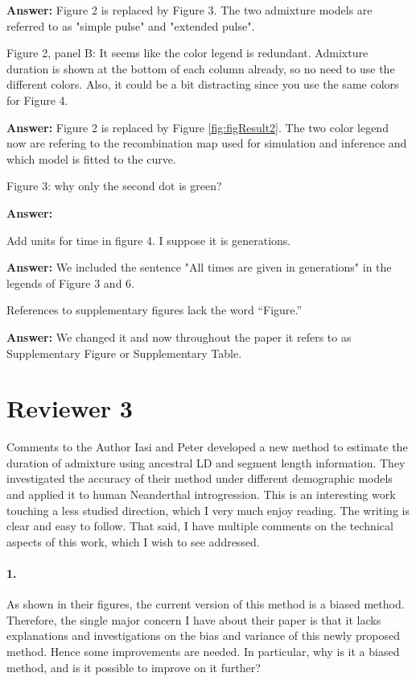\documentclass[11pt]{article}
\let\oldparagraph\paragraph
\renewcommand{\paragraph}[1]{\oldparagraph{#1}\mbox{}}
\begin{document}
\textbf{Answer:} Figure 2 is replaced by Figure 3. The two admixture models are referred  to as "simple pulse" and "extended pulse".


Figure 2, panel B: It seems like the color legend is redundant. Admixture duration is shown at the bottom of each column already, so no need to use the different colors. Also, it could be a bit distracting since you use the same colors for Figure 4. 

\textbf{Answer:} Figure 2 is replaced by Figure \ref{fig:figResult2}. The two color legend now are refering to the recombination map used for simulation and inference and which model is fitted to the curve.

Figure 3: why only the second dot is green?

\textbf{Answer:} 

Add units for time in figure 4. I suppose it is generations.

\textbf{Answer:} We included the sentence "All times are given in generations" in the legends of Figure 3 and 6.

References to supplementary figures lack the word “Figure.” 

\textbf{Answer:} We changed it and now throughout the paper it refers to as Supplementary Figure or Supplementary Table.

\section{Reviewer 3}\label{Reviewer 3}

Comments to the Author
Iasi and Peter developed a new method to estimate the duration of admixture using ancestral LD and segment length information. They investigated the accuracy of their method under different demographic models and applied it to human Neanderthal introgression. This is an interesting work touching a less studied direction, which I very much enjoy reading. The writing is clear and easy to follow. That said, I have multiple comments on the technical aspects of this work, which I wish to see addressed. 

\paragraph{1.}
As shown in their figures, the current version of this method is a biased method. Therefore, the single major concern I have about their paper is that it lacks explanations and investigations on the bias and variance of this newly proposed method. Hence some improvements are needed. In particular, why is it a biased method, and is it possible to improve on it further?
\end{document}

